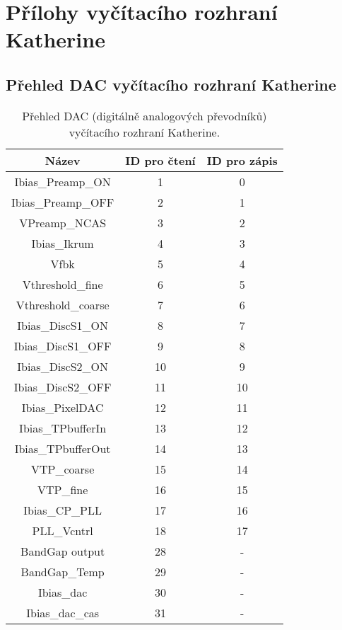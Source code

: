 \chapter{Přílohy vyčítacího rozhraní Katherine}\label{chap:app:katherine}

\section{Přehled DAC vyčítacího rozhraní Katherine}\label{chap:app:katherine:dacs}
\begin{table}[h]
	\begin{center}
		\begin{tabular}{|c|c|c|}
			\hline
            \textbf{Název} & \textbf{ID pro čtení} & \textbf{ID pro zápis} \\
			\hline
            Ibias\_Preamp\_ON & 1 & 0 \\
            Ibias\_Preamp\_OFF & 2 & 1 \\
            VPreamp\_NCAS & 3 & 2 \\
            Ibias\_Ikrum & 4 & 3 \\
            Vfbk & 5 & 4 \\
            Vthreshold\_fine & 6 & 5 \\
            Vthreshold\_coarse & 7 & 6 \\
            Ibias\_DiscS1\_ON & 8 & 7 \\
            Ibias\_DiscS1\_OFF & 9 & 8 \\
            Ibias\_DiscS2\_ON & 10 & 9 \\
            Ibias\_DiscS2\_OFF & 11 & 10 \\
            Ibias\_PixelDAC & 12 & 11 \\
            Ibias\_TPbufferIn & 13 & 12 \\
            Ibias\_TPbufferOut & 14 & 13 \\
            VTP\_coarse & 15 & 14 \\
            VTP\_fine & 16 & 15 \\
            Ibias\_CP\_PLL & 17 & 16 \\
            PLL\_Vcntrl & 18 & 17 \\
            BandGap output & 28 & - \\
            BandGap\_Temp & 29 & - \\
            Ibias\_dac & 30 & - \\
            Ibias\_dac\_cas & 31 & - \\
			\hline
		\end{tabular}
	\end{center}
	\caption{Přehled DAC (digitálně analogových převodníků) vyčítacího rozhraní Katherine.}
	\label{tab:app:dacs}
\end{table}

